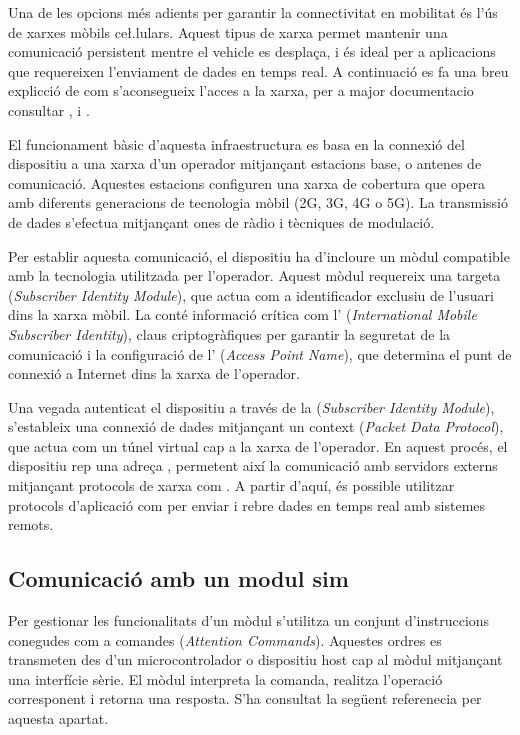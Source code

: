 \documentclass{tfgitic}[2024/07/01]
\begin{document}
Una de les opcions més adients per garantir la connectivitat en mobilitat és l'ús de xarxes mòbils ce\l.lulars. Aquest tipus de xarxa permet mantenir una comunicació 
persistent mentre el vehicle es desplaça, i és ideal per a aplicacions que requereixen l'enviament de dades en temps real. A continuació es fa una breu 
explicció de com s'aconsegueix l'acces a la xarxa, per a major documentacio consultar \cite{wikipedia_gsm}, \cite{adslzone_apn} i \cite{datascientest_pdp}.

El funcionament bàsic d'aquesta infraestructura es basa en la connexió del dispositiu a una xarxa d'un operador mitjançant estacions base, o antenes de comunicació. 
Aquestes estacions configuren una xarxa de cobertura que opera amb diferents generacions de tecnologia mòbil (2G, 3G, 4G o 5G). La transmissió de dades s'efectua 
mitjançant ones de ràdio i tècniques de modulació.

Per establir aquesta comunicació, el dispositiu ha d'incloure un mòdul compatible amb la tecnologia utilitzada per l'operador. Aquest mòdul requereix una 
targeta  (\textit{Subscriber Identity Module}), que actua com a identificador exclusiu de l'usuari dins la xarxa mòbil. La  conté informació crítica com l' 
(\textit{International Mobile Subscriber Identity}), claus criptogràfiques per garantir la seguretat de la comunicació i la configuració de l' (\textit{Access Point Name}), 
que determina el punt de connexió a Internet dins la xarxa de l'operador.

Una vegada autenticat el dispositiu a través de la  (\textit{Subscriber Identity Module}), s'estableix una connexió de dades mitjançant un context  (\textit{Packet Data Protocol}), que actua com un 
túnel virtual cap a la xarxa de l'operador. En aquest procés, el dispositiu rep una adreça , permetent així la comunicació amb servidors externs mitjançant 
protocols de xarxa com . A partir d'aquí, és possible utilitzar protocols d'aplicació com  per enviar i rebre dades en temps real amb sistemes remots.

\subsection{Comunicació amb un modul sim}

Per gestionar les funcionalitats d'un mòdul  s'utilitza un conjunt d'instruccions conegudes com a comandes  (\textit{Attention Commands}). Aquestes ordres es 
transmeten des d'un microcontrolador o dispositiu host cap al mòdul mitjançant una interfície sèrie. El mòdul interpreta la comanda, realitza l'operació 
corresponent i retorna una resposta. S'ha consultat la següent referenecia \cite{onomondo_at} per aquesta apartat.
\end{document}

